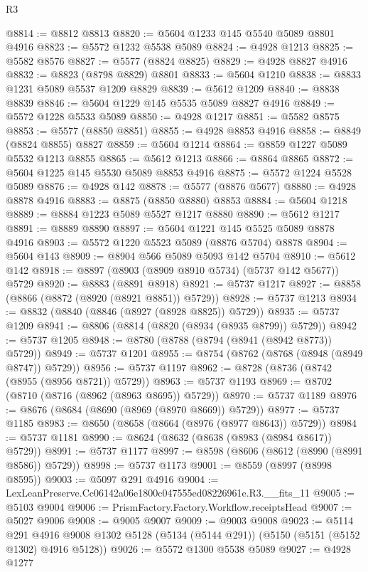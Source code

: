 \begin{lexlean}{R3}
\begin{coremodule}
@8814 := @8812 @8813
@8820 := @5604 @1233 @145 @5540 @5089 @8801 @4916
@8823 := @5572 @1232 @5538 @5089
@8824 := @4928 @1213
@8825 := @5582 @8576
@8827 := @5577 (@8824 @8825)
@8829 := @4928 @8827 @4916
@8832 := @8823 (@8798 @8829) @8801
@8833 := @5604 @1210
@8838 := @8833 @1231 @5089 @5537 @1209 @8829
@8839 := @5612 @1209
@8840 := @8838 @8839
@8846 := @5604 @1229 @145 @5535 @5089 @8827 @4916
@8849 := @5572 @1228 @5533 @5089
@8850 := @4928 @1217
@8851 := @5582 @8575
@8853 := @5577 (@8850 @8851)
@8855 := @4928 @8853 @4916
@8858 := @8849 (@8824 @8855) @8827
@8859 := @5604 @1214
@8864 := @8859 @1227 @5089 @5532 @1213 @8855
@8865 := @5612 @1213
@8866 := @8864 @8865
@8872 := @5604 @1225 @145 @5530 @5089 @8853 @4916
@8875 := @5572 @1224 @5528 @5089
@8876 := @4928 @142
@8878 := @5577 (@8876 @5677)
@8880 := @4928 @8878 @4916
@8883 := @8875 (@8850 @8880) @8853
@8884 := @5604 @1218
@8889 := @8884 @1223 @5089 @5527 @1217 @8880
@8890 := @5612 @1217
@8891 := @8889 @8890
@8897 := @5604 @1221 @145 @5525 @5089 @8878 @4916
@8903 := @5572 @1220 @5523 @5089 (@8876 @5704) @8878
@8904 := @5604 @143
@8909 := @8904 @566 @5089 @5093 @142 @5704
@8910 := @5612 @142
@8918 := @8897 (@8903 (@8909 @8910 @5734) (@5737 @142 @5677)) @5729
@8920 := @8883 (@8891 @8918)
@8921 := @5737 @1217
@8927 := @8858 (@8866 (@8872 (@8920 (@8921 @8851)) @5729))
@8928 := @5737 @1213
@8934 := @8832 (@8840 (@8846 (@8927 (@8928 @8825)) @5729))
@8935 := @5737 @1209
@8941 := @8806 (@8814 (@8820 (@8934 (@8935 @8799)) @5729))
@8942 := @5737 @1205
@8948 := @8780 (@8788 (@8794 (@8941 (@8942 @8773)) @5729))
@8949 := @5737 @1201
@8955 := @8754 (@8762 (@8768 (@8948 (@8949 @8747)) @5729))
@8956 := @5737 @1197
@8962 := @8728 (@8736 (@8742 (@8955 (@8956 @8721)) @5729))
@8963 := @5737 @1193
@8969 := @8702 (@8710 (@8716 (@8962 (@8963 @8695)) @5729))
@8970 := @5737 @1189
@8976 := @8676 (@8684 (@8690 (@8969 (@8970 @8669)) @5729))
@8977 := @5737 @1185
@8983 := @8650 (@8658 (@8664 (@8976 (@8977 @8643)) @5729))
@8984 := @5737 @1181
@8990 := @8624 (@8632 (@8638 (@8983 (@8984 @8617)) @5729))
@8991 := @5737 @1177
@8997 := @8598 (@8606 (@8612 (@8990 (@8991 @8586)) @5729))
@8998 := @5737 @1173
@9001 := @8559 (@8997 (@8998 @8595))
@9003 := @5097 @291 @4916
@9004 := LexLeanPreserve.Cc06142a06e1800c047555ed08226961e.R3.__fits_11
@9005 := @5103 @9004
@9006 := PrismFactory.Factory.Workflow.receiptsHead
@9007 := @5027 @9006
@9008 := @9005 @9007
@9009 := @9003 @9008
@9023 := @5114
    @291
    @4916
    @9008
    @1302
    @5128
    (@5134 (@5144 @291))
    (@5150 (@5151 (@5152 @1302) @4916 @5128))
@9026 := @5572 @1300 @5538 @5089
@9027 := @4928 @1277

\end{coremodule}
\end{lexlean}
